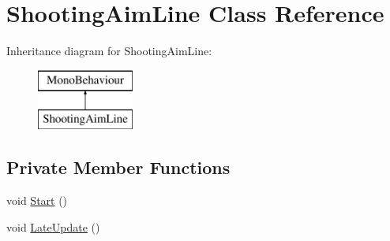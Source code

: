 \hypertarget{class_shooting_aim_line}{}\section{Shooting\+Aim\+Line Class Reference}
\label{class_shooting_aim_line}
Inheritance diagram for Shooting\+Aim\+Line\+:\begin{figure}[H]
\begin{center}
\leavevmode
\includegraphics[height=2.000000cm]{class_shooting_aim_line}
\end{center}
\end{figure}
\subsection*{Private Member Functions}
\begin{DoxyCompactItemize}
\item 
void \hyperlink{class_shooting_aim_line_aea74f66ae5a79b70d07dbc7fe4970f34}{Start} ()
\item 
void \hyperlink{class_shooting_aim_line_abe1fb3aafc6c03c5010c842026b1368a}{Late\+Update} ()
\end{DoxyCompactItemize}
